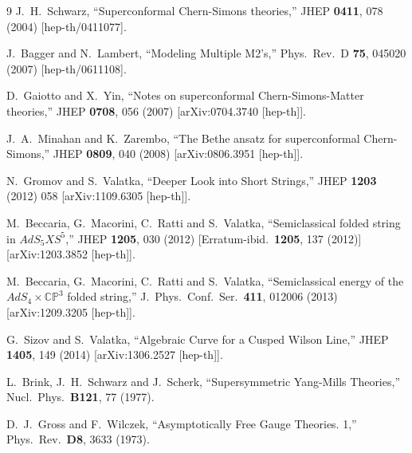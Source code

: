 \documentclass[a4paper,11pt]{article}
\numberwithin{equation}{section}
\begin{document}
\begin{thebibliography} {9}
  J.~H.~Schwarz,
  ``Superconformal Chern-Simons theories,''
  JHEP {\bf 0411}, 078 (2004)
  [hep-th/0411077].

  J.~Bagger and N.~Lambert,
  ``Modeling Multiple M2's,''
  Phys.\ Rev.\ D {\bf 75}, 045020 (2007)
  [hep-th/0611108].

  D.~Gaiotto and X.~Yin,
  ``Notes on superconformal Chern-Simons-Matter theories,''
  JHEP {\bf 0708}, 056 (2007)
  [arXiv:0704.3740 [hep-th]].

  J.~A.~Minahan and K.~Zarembo,
  ``The Bethe ansatz for superconformal Chern-Simons,''
  JHEP {\bf 0809}, 040 (2008)
  [arXiv:0806.3951 [hep-th]].
  
  N.~Gromov and S.~Valatka,
  ``Deeper Look into Short Strings,''
  JHEP {\bf 1203} (2012) 058
  [arXiv:1109.6305 [hep-th]].

  M.~Beccaria, G.~Macorini, C.~Ratti and S.~Valatka,
  ``Semiclassical folded string in $AdS_5 X S^5$,''
  JHEP {\bf 1205}, 030 (2012)
  [Erratum-ibid.\  {\bf 1205}, 137 (2012)]
  [arXiv:1203.3852 [hep-th]].

  M.~Beccaria, G.~Macorini, C.~Ratti and S.~Valatka,
  ``Semiclassical energy of the $AdS_4 \times \mathbb{CP}^3$ folded string,''
  J.\ Phys.\ Conf.\ Ser.\  {\bf 411}, 012006 (2013)
  [arXiv:1209.3205 [hep-th]].

  G.~Sizov and S.~Valatka,
  ``Algebraic Curve for a Cusped Wilson Line,''
  JHEP {\bf 1405}, 149 (2014)
  [arXiv:1306.2527 [hep-th]].

 L.~Brink, J.~H.~Schwarz and J.~Scherk, 
 ``Supersymmetric Yang-Mills Theories,''
  Nucl.\ Phys.\ {\bf B121}, 77 (1977).

	D.~J.~Gross and F.~Wilczek, 
	``Asymptotically Free Gauge Theories. 1,''
	Phys.\ Rev.\ {\bf D8}, 3633 (1973).


\end{thebibliography}
\end{document}
